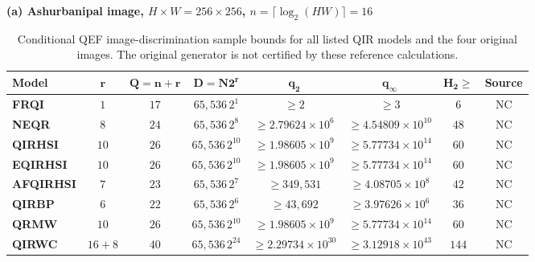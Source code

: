\begin{table}
\centering\color{red}
\caption{{\color{red}Conditional QEF image-discrimination sample bounds for all listed QIR models and the four original images. The original generator is not certified by these reference calculations.}}
\label{tab:qef_quantum_attack_resistance}
\vspace{0.25cm}
\textbf{(a) Ashurbanipal image, $H\times W=256\times256$, $n=\lceil\log_2(HW)\rceil=16$}\\[3pt]
{\footnotesize\setlength{\tabcolsep}{4pt}
\begin{tabular}{lccccccc}
\hline\rowcolor{Bisque3}
\textbf{Model} & $\boldsymbol{r}$ & $\boldsymbol{Q=n+r}$ & $\boldsymbol{D=N2^r}$ & $\boldsymbol{q_2}$ & $\boldsymbol{q_\infty}$ & $\boldsymbol{H_2\geq}$ & \textbf{Source}\\
\hline
\textbf{FRQI} & \(1\) & \(17\) & \(65{,}536\,2^{1}\) & $\geq 2$ & $\geq 3$ & \(6\) & NC \\
\textbf{NEQR} & \(8\) & \(24\) & \(65{,}536\,2^{8}\) & $\geq 2.79624\times10^{6}$ & $\geq 4.54809\times10^{10}$ & \(48\) & NC \\
\textbf{QIRHSI} & \(10\) & \(26\) & \(65{,}536\,2^{10}\) & $\geq 1.98605\times10^{9}$ & $\geq 5.77734\times10^{14}$ & \(60\) & NC \\
\textbf{EQIRHSI} & \(10\) & \(26\) & \(65{,}536\,2^{10}\) & $\geq 1.98605\times10^{9}$ & $\geq 5.77734\times10^{14}$ & \(60\) & NC \\
\textbf{AFQIRHSI} & \(7\) & \(23\) & \(65{,}536\,2^{7}\) & $\geq 349{,}531$ & $\geq 4.08705\times10^{8}$ & \(42\) & NC \\
\textbf{QIRBP} & \(6\) & \(22\) & \(65{,}536\,2^{6}\) & $\geq 43{,}692$ & $\geq 3.97626\times10^{6}$ & \(36\) & NC \\
\textbf{QRMW} & \(10\) & \(26\) & \(65{,}536\,2^{10}\) & $\geq 1.98605\times10^{9}$ & $\geq 5.77734\times10^{14}$ & \(60\) & NC \\
\textbf{QIRWC} & \(16+8\) & \(40\) & \(65{,}536\,2^{24}\) & $\geq 2.29734\times10^{30}$ & $\geq 3.12918\times10^{43}$ & \(144\) & NC \\
\hline\end{tabular}}\par


\end{table}
